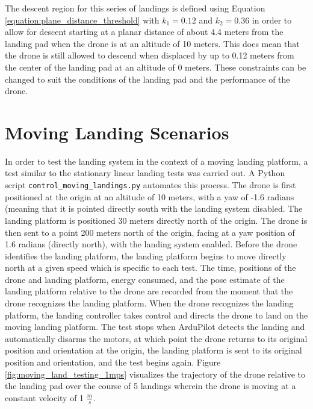 The descent region for this series of landings is defined using Equation \ref{equation:plane_distance_threshold} with $k_1=0.12$ and $k_2=0.36$ in order to allow for descent starting at a planar distance of about 4.4 meters from the landing pad when the drone is at an altitude of 10 meters. This does mean that the drone is still allowed to descend when displaced by up to 0.12 meters from the center of the landing pad at an altitude of 0 meters. These constraints can be changed to suit the conditions of the landing pad and the performance of the drone.


\section{Moving Landing Scenarios}
\label{section:moving_landing_scenarios}

In order to test the landing system in the context of a moving landing platform, a test similar to the stationary linear landing tests was carried out. A Python script \texttt{control\_moving\_landings.py} automates this process. The drone is first positioned at the origin at an altitude of 10 meters, with a yaw of -1.6 radians (meaning that it is pointed directly south with the landing system disabled. The landing platform is positioned 30 meters directly north of the origin. The drone is then sent to a point 200 meters north of the origin, facing at a yaw position of 1.6 radians (directly north), with the landing system enabled. Before the drone identifies the landing platform, the landing platform begins to move directly north at a given speed which is specific to each test. The time, positions of the drone and landing platform, energy consumed, and the pose estimate of the landing platform relative to the drone are recorded from the moment that the drone recognizes the landing platform. When the drone recognizes the landing platform, the landing controller takes control and directs the drone to land on the moving landing platform. The test stops when ArduPilot detects the landing and automatically disarms the motors, at which point the drone returns to its original position and orientation at the origin, the landing platform is sent to its original position and orientation, and the test begins again. Figure \ref{fig:moving_land_testing_1mps} visualizes the trajectory of the drone relative to the landing pad over the course of 5 landings wherein the drone is moving at a constant velocity of 1 $\frac{m}{s}$. 

